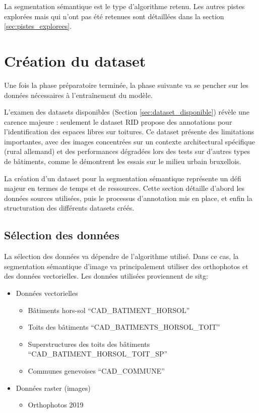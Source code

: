 La segmentation sémantique est le type d'algorithme retenu. Les autres pistes explorées mais qui n'ont pas été retenues sont détaillées dans la section \ref{sec:pistes_explorees}.

\section{Création du dataset}
Une fois la phase préparatoire terminée, la phase suivante va se pencher sur les données nécessaires à l'entraînement du modèle.

L'examen des datasets disponibles (Section \ref{sec:dataset_disponible}) révèle une carence majeure : seulement le dataset RID propose des annotations pour l'identification des espaces libres sur toitures. Ce dataset présente des limitations importantes, avec des images concentrées sur un contexte architectural spécifique (rural allemand) et des performances dégradées lors des tests sur d'autres types de bâtiments, comme le démontrent les essais sur le milieu urbain bruxellois.

La création d'un dataset pour la segmentation sémantique représente un défi majeur en termes de temps et de ressources. Cette section détaille d'abord les données sources utilisées, puis le processus d'annotation mis en place, et enfin la structuration des différents datasets créés.

\subsection{Sélection des données}
La sélection des données va dépendre de l'algorithme utilisé. Dans ce cas, la segmentation sémantique d'image va principalement utiliser des orthophotos et des données vectorielles. Les données utilisées proviennent de \acrshort{sitg}:
\begin{itemize}
    \item Données vectorielles
    \begin{itemize}
        \item Bâtiments hors-sol ``CAD\_BATIMENT\_HORSOL'' \cite{sitg_batiments_nodate}
        \item Toits des bâtiments ``CAD\_BATIMENTS\_HORSOL\_TOIT'' \cite{sitg_toits_nodate}
        \item Superstructures des toits des bâtiments ``CAD\_BATIMENT\_HORSOL\_TOIT\_SP'' \cite{sitg_superstructures_nodate}
        \item Communes genevoises ``CAD\_COMMUNE'' \cite{sitg_communes_nodate}
    \end{itemize}
    \item Données raster (images)
    \begin{itemize}
        \item Orthophotos 2019 \cite{sitg_orthophotos_nodate}
    \end{itemize}
\end{itemize}

